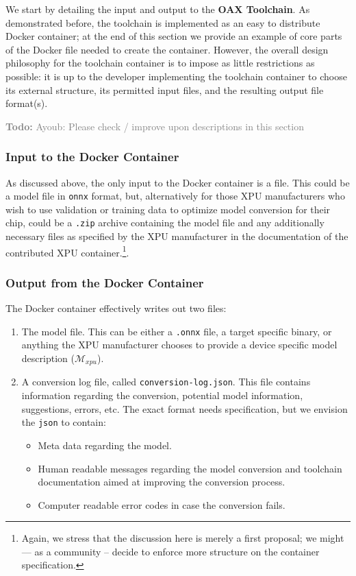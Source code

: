 \documentclass{article}
\newcommand{\todo}[1]{\textcolor{gray}{\textbf{Todo:} #1}}
\begin{document}
We start by detailing the input and output to the \textbf{OAX Toolchain}. As demonstrated before, the toolchain is implemented as an easy to distribute Docker container; at the end of this section we provide an example of core parts of the Docker file needed to create the container. However, the overall design philosophy for the toolchain container is to impose as little restrictions as possible: it is up to the developer implementing the toolchain container to choose its external structure, its permitted input files, and the resulting output file format(s).

\todo{Ayoub: Please check / improve upon descriptions in this section}

\subsubsection{Input to the Docker Container}

As discussed above, the only input to the Docker container is a file. This could be a model file in \texttt{onnx} format, but, alternatively for those XPU manufacturers who wish to use validation or training data to optimize model conversion for their chip, could be a \texttt{.zip} archive containing the model file and any additionally necessary files as specified by the XPU manufacturer in the documentation of the contributed XPU container.\footnote{Again, we stress that the discussion here is merely a first proposal; we might --- as a community -- decide to enforce more structure on the container specification.}.

\subsubsection{Output from the Docker Container}

The Docker container effectively writes out two files:
\begin{enumerate}
\item The model file. This can be either a \texttt{.onnx} file, a target specific binary, or anything the XPU manufacturer chooses to provide a device specific model description ($ \mathcal{M}_{xpu}$).
\item A conversion log file, called \texttt{conversion-log.json}. This file contains information regarding the conversion, potential model information, suggestions, errors, etc. The exact format needs specification, but we envision the \texttt{json} to contain:
	\begin{itemize}
		\item Meta data regarding the model.
		\item Human readable messages regarding the model conversion and toolchain documentation aimed at improving the conversion process.
		\item Computer readable error codes in case the conversion fails.
	\end{itemize}
\end{enumerate}
\end{document}
